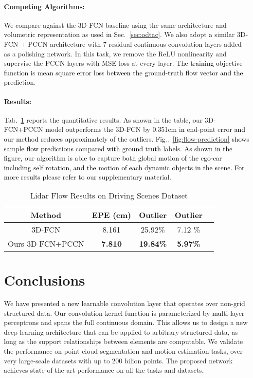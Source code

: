 \documentclass[10pt,twocolumn,letterpaper]{article}
\makeatletter
\newcommand\shenlong[1]{\textcolor{black}{#1}}
\def\@onedot{\ifx\@let@token.\else.\null\fi\xspace}
\DeclareRobustCommand\onedot{\futurelet\@let@token\@onedot}
\newcommand{\figref}[1]{Fig\onedot~\ref{#1}}
\makeatother
\begin{document}
\paragraph{Competing Algorithms:} We compare against the 3D-FCN baseline using the same architecture and volumetric representation as used in Sec.~\ref{sec:odtac}. We also adopt a similar 3D-FCN + PCCN architecture with 7 residual continuous convolution layers added as a polishing network. In this task, we remove the ReLU nonlinearity and supervise the PCCN layers with MSE loss at every layer. \shenlong{The training objective function is mean square error loss between the ground-truth flow vector and the prediction.}
\paragraph{Results:} Tab.~\ref{tab-lidarflow} reports the quantitative results. As shown in the table, our 3D-FCN+PCCN model outperforms the 3D-FCN by 0.351cm in end-point error \shenlong{and our method reduces approximately  of the outliers. \figref{fig:flow-prediction} shows sample flow predictions compared with ground truth labels. As shown in the figure, our algorithm is able to capture both global motion of the ego-car including self rotation, and the motion of each dynamic objects in the scene. For more results please refer to our supplementary material.}

\begin{table}[]
\centering
\footnotesize
\begin{tabular}{c|cccc}
Method       			& EPE (cm)  			& Outlier 	& Outlier	\\ \hline
3D-FCN       			& 8.161 				& 25.92\% 			& 7.12 \% \\ \hline
Ours 3D-FCN+PCCN 		& \textbf{7.810} 		& \textbf{19.84\%}	& \textbf{5.97\%} \\
\end{tabular}
\vspace{-3mm}
\caption{Lidar Flow Results on Driving Scenes Dataset}
\label{tab-lidarflow}
\end{table}








 
\section{Conclusions}
We have presented a new learnable convolution layer that operates over non-grid structured data. Our convolution kernel function is parameterized by multi-layer perceptrons and spans the full continuous domain. This allows us to design a new deep learning architecture that can be applied to arbitrary structured data, as long as the support relationships between elements are computable. We validate the performance on point cloud segmentation and motion estimation tasks, over very large-scale datasets with up to 200 bilion points. The proposed network achieves state-of-the-art performance on all the tasks and datasets. 
 
\end{document}
